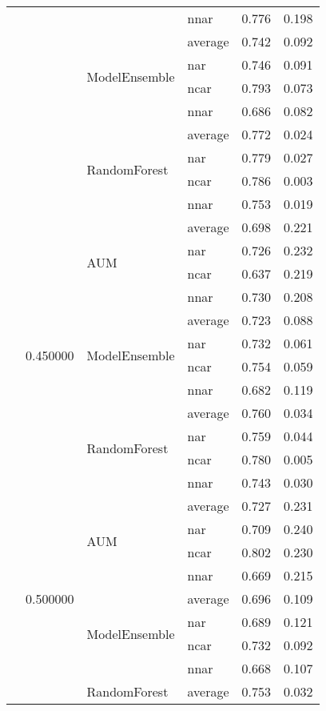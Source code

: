 \begin{longtable}{llllrr}
 &  &  & nnar & 0.776 & 0.198 \\
\cline{3-6}
 &  & \multirow[t]{4}{*}{ModelEnsemble} & average & 0.742 & 0.092 \\
 &  &  & nar & 0.746 & 0.091 \\
 &  &  & ncar & 0.793 & 0.073 \\
 &  &  & nnar & 0.686 & 0.082 \\
\cline{3-6}
 &  & \multirow[t]{4}{*}{RandomForest} & average & 0.772 & 0.024 \\
 &  &  & nar & 0.779 & 0.027 \\
 &  &  & ncar & 0.786 & 0.003 \\
 &  &  & nnar & 0.753 & 0.019 \\
\cline{2-6} \cline{3-6}
 & \multirow[t]{12}{*}{0.450000} & \multirow[t]{4}{*}{AUM} & average & 0.698 & 0.221 \\
 &  &  & nar & 0.726 & 0.232 \\
 &  &  & ncar & 0.637 & 0.219 \\
 &  &  & nnar & 0.730 & 0.208 \\
\cline{3-6}
 &  & \multirow[t]{4}{*}{ModelEnsemble} & average & 0.723 & 0.088 \\
 &  &  & nar & 0.732 & 0.061 \\
 &  &  & ncar & 0.754 & 0.059 \\
 &  &  & nnar & 0.682 & 0.119 \\
\cline{3-6}
 &  & \multirow[t]{4}{*}{RandomForest} & average & 0.760 & 0.034 \\
 &  &  & nar & 0.759 & 0.044 \\
 &  &  & ncar & 0.780 & 0.005 \\
 &  &  & nnar & 0.743 & 0.030 \\
\cline{2-6} \cline{3-6}
 & \multirow[t]{12}{*}{0.500000} & \multirow[t]{4}{*}{AUM} & average & 0.727 & 0.231 \\
 &  &  & nar & 0.709 & 0.240 \\
 &  &  & ncar & 0.802 & 0.230 \\
 &  &  & nnar & 0.669 & 0.215 \\
\cline{3-6}
 &  & \multirow[t]{4}{*}{ModelEnsemble} & average & 0.696 & 0.109 \\
 &  &  & nar & 0.689 & 0.121 \\
 &  &  & ncar & 0.732 & 0.092 \\
 &  &  & nnar & 0.668 & 0.107 \\
\cline{3-6}
 &  & \multirow[t]{4}{*}{RandomForest} & average & 0.753 & 0.032 \\

\end{longtable}
